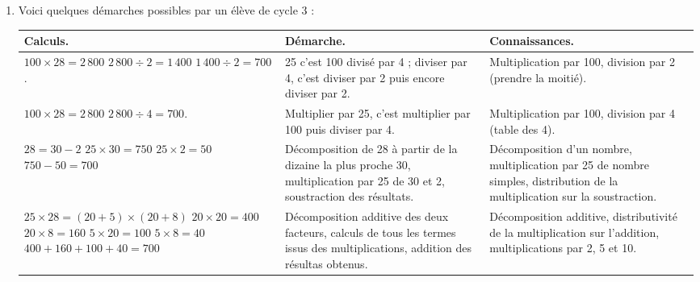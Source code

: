 \begin{enumerate}
\begin{itemize}
   \end{itemize}
   \item Voici quelques démarches possibles par un élève de cycle 3 : \\ [3mm]
\begin{tabular}{|p{4.8cm}|p{5.2cm}|p{4.6cm}|}
      \hline
      Calculs. & Démarche. & Connaissances. \\
      \hline
      $100\times28 =2\,800$ \newline
      $2\,800\div2 =1\,400$ \newline
      $1\,400\div2 =700$.
      &
      25 c'est 100 divisé par 4 ; diviser par 4, c'est diviser par 2 puis encore diviser par 2.
      &
      Multiplication par 100, division par 2 (prendre la moitié). \\
      \hline
      $100\times28 =2\,800$ \newline
      $2\,800\div4 =700$.
      &
      Multiplier par 25, c'est multiplier par 100 puis diviser par 4.
      &
      Multiplication par 100, \newline
      division par 4 (table des 4). \\
      \hline
      $28 =30-2$ \newline
      $25\times30 =750$ \newline
      $25\times2 =50$ \newline
      $750-50 =700$
      &
      Décomposition de 28 à partir de la dizaine la plus proche 30,  multiplication par 25 de 30 et 2, soustraction des résultats.
      &
      Décomposition d'un nombre, multiplication par 25 de nombre simples, distribution de la multiplication sur la soustraction. \\
      \hline
      $25\times28 =(20+5)\times(20+8)$ \newline
      $20\times20 =400$ \newline
      $20\times8 =160$ \newline
      $5\times20 =100$ \newline
      $5\times8 =40$ \newline
      $400+160+100+40 =700$
      &
      Décomposition additive des deux facteurs, calculs de tous les termes issus des multiplications, addition des résultas obtenus.
      &
      Décomposition additive, distributivité de la multiplication sur l'addition, multiplications par 2, 5 et 10. \\
      \hline
   \end{tabular}
\end{enumerate}
